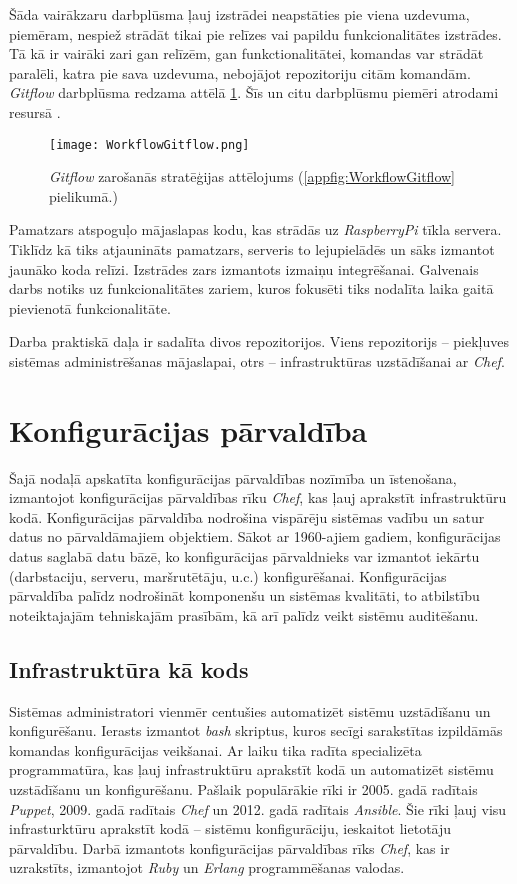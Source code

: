 Šāda vairākzaru darbplūsma ļauj izstrādei neapstāties pie viena uzdevuma, piemēram, nespiež strādāt tikai pie relīzes vai papildu funkcionalitātes izstrādes. Tā kā ir vairāki zari gan relīzēm, gan funkctionalitātei, komandas var strādāt paralēli, katra pie sava uzdevuma, nebojājot repozitoriju citām komandām.
 \textit{Gitflow} darbplūsma redzama attēlā \ref{fig:WorkflowGitflow}. Šīs un citu darbplūsmu piemēri atrodami resursā \cite{workflow-comparison}.
\begin{figure}[H]%
	\centering
	\captionsetup{justification=centering}
	\texttt{[image: WorkflowGitflow.png]}
	\caption{\textit{Gitflow} zarošanās stratēģijas attēlojums (\ref{appfig:WorkflowGitflow} pielikumā.)}
	\label{fig:WorkflowGitflow}
\end{figure}
Pamatzars atspoguļo mājaslapas kodu, kas strādās uz \textit{RaspberryPi} tīkla servera. Tiklīdz kā tiks atjaunināts pamatzars, serveris to lejupielādēs un sāks izmantot jaunāko koda relīzi.
Izstrādes zars izmantots izmaiņu integrēšanai.
Galvenais darbs notiks uz funkcionalitātes zariem, kuros fokusēti tiks nodalīta laika gaitā pievienotā funkcionalitāte.



Darba praktiskā daļa ir sadalīta divos repozitorijos. Viens repozitorijs -- piekļuves sistēmas administrēšanas mājaslapai, otrs -- infrastruktūras uzstādīšanai ar \textit{Chef}.

\chapter{Konfigurācijas pārvaldība}
Šajā nodaļā apskatīta konfigurācijas pārvaldības nozīmība un īstenošana, izmantojot konfigurācijas pārvaldības rīku \textit{Chef}, kas ļauj aprakstīt infrastruktūru kodā.
Konfigurācijas pārvaldība nodrošina vispārēju sistēmas vadību un satur datus no pārvaldāmajiem objektiem. Sākot ar 1960-ajiem gadiem, konfigurācijas datus saglabā datu bāzē, ko konfigurācijas pārvaldnieks var izmantot iekārtu (darbstaciju, serveru, maršrutētāju, u.c.) konfigurēšanai.
Konfigurācijas pārvaldība palīdz nodrošināt komponenšu un sistēmas kvalitāti, to atbilstību noteiktajajām tehniskajām prasībām, kā arī palīdz veikt sistēmu auditēšanu.

\section{Infrastruktūra kā kods}
Sistēmas administratori vienmēr centušies automatizēt sistēmu uzstādīšanu un konfigurēšanu. Ierasts izmantot \textit{bash} skriptus, kuros secīgi sarakstītas izpildāmās komandas konfigurācijas veikšanai. Ar laiku tika radīta specializēta programmatūra, kas ļauj infrastruktūru aprakstīt kodā un automatizēt sistēmu uzstādīšanu un konfigurēšanu. Pašlaik populārākie rīki ir 2005. gadā radītais \textit{Puppet}, 2009. gadā radītais \textit{Chef} un 2012. gadā radītais \textit{Ansible}. Šie rīki ļauj visu infrasturktūru aprakstīt kodā -- sistēmu konfigurāciju, ieskaitot lietotāju pārvaldību. Darbā izmantots konfigurācijas pārvaldības rīks \textit{Chef}, kas ir uzrakstīts, izmantojot \textit{Ruby} un \textit{Erlang} programmēšanas valodas.


